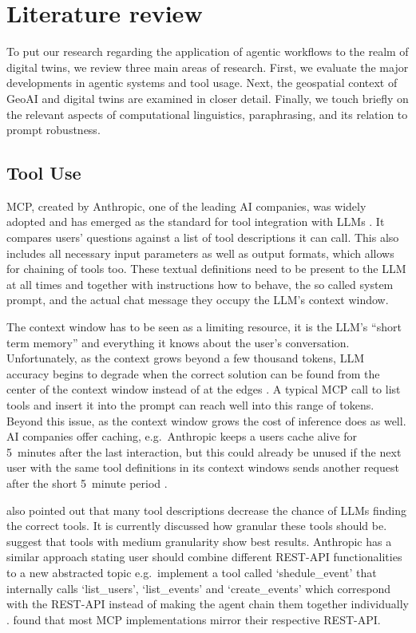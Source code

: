 \section{Literature review}
\label{sec:literature-review}

To put our research regarding the application of agentic workflows to the realm of digital
twins, we review three main areas of research. First, we evaluate the major developments in
agentic systems and tool usage. Next, the geospatial context of GeoAI and digital twins are
examined in closer detail. Finally, we touch briefly on the relevant aspects of computational
linguistics, paraphrasing, and its relation to prompt robustness.

\subsection{Tool Use}
\label{sec:tool-use}

MCP, created by Anthropic, one of the leading AI companies, was widely adopted and has emerged
as the standard for tool integration with LLMs \citep{anthropic2024}. It compares users'
questions against a list of tool descriptions it can call. This also includes all necessary
input parameters as well as output formats, which allows for chaining of tools too. These
textual definitions need to be present to the LLM at all times and together with instructions
how to behave, the so called system prompt, and the actual chat message they occupy the LLM's
context window.

The context window has to be seen as a limiting resource, it is the LLM's ``short term memory''
and everything it knows about the user's conversation. Unfortunately, as the context grows
beyond a few thousand tokens, LLM accuracy begins to degrade when the correct solution can be
found from the center of the context window instead of at the edges \citep{liu2024}. A typical
MCP call to list tools and insert it into the prompt can reach well into this range of tokens.
Beyond this issue, as the context window grows the cost of inference does as well. AI companies
offer caching, e.g.\ Anthropic keeps a users cache alive for 5~minutes after the last
interaction, but this could already be unused if the next user with the same tool definitions in
its context windows sends another request after the short 5~minute period
\citep{anthropicdocs}.

\citet{gan2025} also pointed out that many tool descriptions decrease the chance of LLMs finding
the correct tools. It is currently discussed how granular these tools should be.
\citet{paschalides2026} suggest that tools with medium granularity show best results. Anthropic
has a similar approach stating user should combine different REST-API functionalities to a new
abstracted topic e.g.\ implement a tool called `shedule\_event' that internally calls
`list\_users', `list\_events' and `create\_events' which correspond with the REST-API instead of
making the agent chain them together individually \citep{anthropic2025a}. \citet{mastouri2026}
found that most MCP implementations mirror their respective REST-API.

